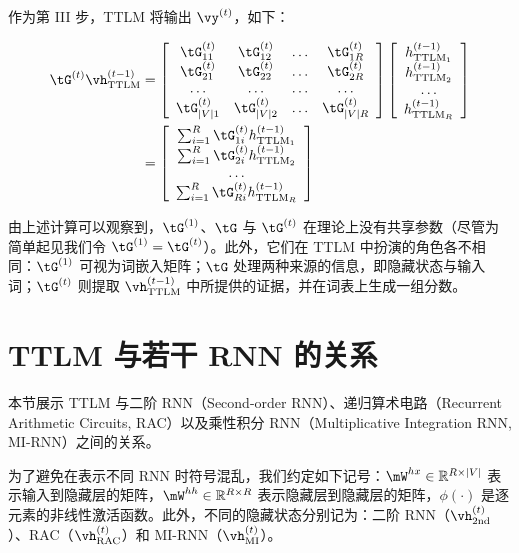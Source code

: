 \documentclass{article}
\theoremstyle{plain}
\theoremstyle{definition}
\theoremstyle{remark}
\begin{document}
作为第 III 步，TTLM 将输出 $\vy^{(t)}$，如下：

\begin{align}
\tG^{(t)}\vh^{(t-1)}_{\textrm{TTLM}} &=
\left[\begin{array}{cccc}
\tG_{11}^{(t)} & \tG_{12}^{(t)} & \ldots & \tG_{1 R}^{(t)} \\
\tG_{21}^{(t)} & \tG_{22}^{(t)} & \ldots & \tG_{2 R}^{(t)} \\
\ldots & \ldots & \ldots & \ldots \\
\tG_{|V| 1}^{(t)} & \tG_{|V| 2}^{(t)} & \ldots & \tG_{|V| R}^{(t)}
\end{array}\right] \left[\begin{array}{c}
h^{(t-1)}_{{\textrm{TTLM}}_1} \\
h^{(t-1)}_{{\textrm{TTLM}}_2} \\
\ldots \\
h^{(t-1)}_{{\textrm{TTLM}}_R}
\end{array}\right] \nonumber \\
&= \left[\begin{array}{c}
\sum_{i=1}^{R}\tG_{1i}^{(t)} h^{(t-1)}_{{\textrm{TTLM}}_1}  \\
\sum_{i=1}^{R}\tG_{2i}^{(t)} h^{(t-1)}_{{\textrm{TTLM}}_2} \\
\ldots \\
\sum_{i=1}^{R}\tG_{Ri}^{(t)} h^{(t-1)}_{{\textrm{TTLM}}_R}
\end{array}\right] \nonumber
\end{align}

由上述计算可以观察到，$\tG^{(1)}$、$\tG$ 与 $\tG^{(t)}$ 在理论上没有共享参数（尽管为简单起见我们令 $\tG^{(1)} = \tG^{(t)}$）。此外，它们在 TTLM 中扮演的角色各不相同：$\tG^{(1)}$ 可视为词嵌入矩阵；$\tG$ 处理两种来源的信息，即隐藏状态与输入词；$\tG^{(t)}$ 则提取 $\vh^{(t-1)}_{\textrm{TTLM}}$ 中所提供的证据，并在词表上生成一组分数。
\section{TTLM 与若干 RNN 的关系}
\label{sec: TTLM generalization}

本节展示 TTLM 与二阶 RNN（Second-order RNN）、递归算术电路（Recurrent Arithmetic Circuits, RAC）以及乘性积分 RNN（Multiplicative Integration RNN, MI-RNN）之间的关系。

为了避免在表示不同 RNN 时符号混乱，我们约定如下记号：$\mW^{hx} \in \mathbb{R}^{R \times |V|}$ 表示输入到隐藏层的矩阵，$\mW^{hh} \in \mathbb{R}^{R \times R}$ 表示隐藏层到隐藏层的矩阵，$\phi(\cdot)$ 是逐元素的非线性激活函数。此外，不同的隐藏状态分别记为：二阶 RNN（$\vh^{(t)}_\textrm{2nd}$）、RAC（$\vh^{(t)}_\textrm{RAC}$）和 MI-RNN（$\vh^{(t)}_\textrm{MI}$）。
\end{document}
